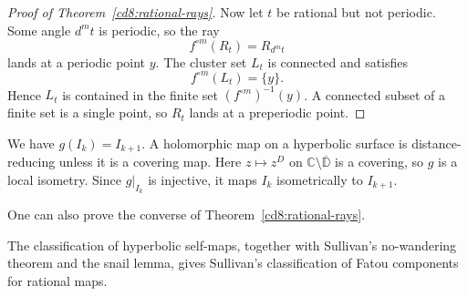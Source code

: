 \documentclass[11pt,a4paper]{article}
\begin{document}
\begin{proof}[Proof of Theorem~\ref{cd8:rational-rays}]
Now let $t$ be rational but not periodic. Some angle $d^mt$ is periodic, so the ray
\[
f^{\circ m}(R_t)=R_{d^mt}
\]
lands at a periodic point $y$. The cluster set $L_t$ is connected and satisfies
\[
f^{\circ m}(L_t)=\{y\}.
\]
Hence $L_t$ is contained in the finite set $(f^{\circ m})^{-1}(y)$. A connected subset of a finite set is a single point, so $R_t$ lands at a preperiodic point.
\end{proof}
\begin{remark}
We have $g(I_k)=I_{k+1}$. A holomorphic map on a hyperbolic surface is distance-reducing unless it is a covering map. Here $z\mapsto z^D$ on $\mathbb C\setminus\overline{\mathbb D}$ is a covering, so $g$ is a local isometry. Since $g|_{I_k}$ is injective, it maps $I_k$ isometrically to $I_{k+1}$.
\end{remark}
\begin{remark}
One can also prove the converse of Theorem~\ref{cd8:rational-rays}.
\end{remark}
\begin{remark}
The classification of hyperbolic self-maps, together with Sullivan's no-wandering theorem and the snail lemma, gives Sullivan's classification of Fatou components for rational maps.
\end{remark}
\end{document}
